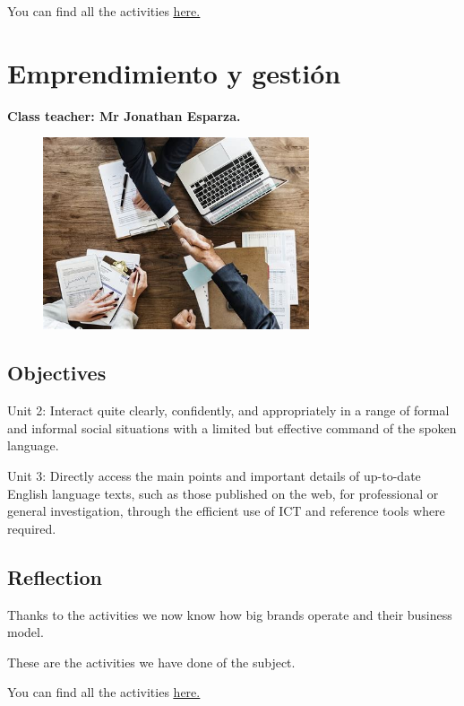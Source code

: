 \documentclass[a4paper, 12pt]{article}
\begin{document}
You can find all the activities \href{https://drive.google.com/drive/folders/1WlRihNI9a31q6NQNiywX2xcR9loMw0VV?usp=sharing}{\underline{here.}}



\section{Emprendimiento y gestión}
\textbf{Class teacher: Mr Jonathan Esparza.}

\begin{figure}[h]
  \includegraphics[width=0.7\textwidth, center]{business.jpeg}
\end{figure}

\subsection{Objectives}

Unit 2: Interact quite clearly, confidently, and appropriately in a range of formal and informal social situations with a limited but effective command of the spoken language.

Unit 3: Directly access the main points and important details of up-to-date English language texts, such as those published on the web, for professional or general investigation, through the efficient use of ICT and reference tools where required.

\subsection{Reflection}

Thanks to the activities we now know how big brands operate and their business model.

These are the activities we have done of the subject.

You can find all the activities \href{https://drive.google.com/drive/folders/1-Z9c3tXC08xXmIgc4JyYJ2_XrgSEcQSL?usp=sharing}{\underline{here.}}
\end{document}

